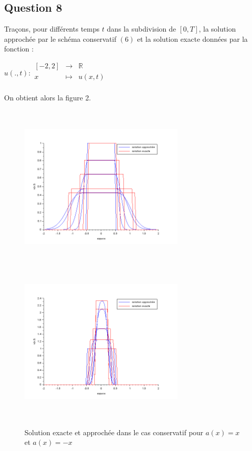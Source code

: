 \documentclass[a4paper,12pt]{article}
\begin{document}
\subsection{Question 8}

Tra\c{c}ons, pour diff\'erents temps $t$ dans la subdivision de $[0,T]$, la solution approch\'ee par le sch\'ema conservatif $(6)$ et la solution exacte donn\'ees par la fonction :
\begin{center}
  $u(.,t):\begin{array}{ccccc}
	[-2,2] & \to & \mathbb{R}\\
	x & \mapsto & u(x,t)\\
	\end{array}$
\end{center}
On obtient alors la figure 2.

\begin{figure}[h!]
\begin{center}
	\includegraphics[width=225pt,height=225pt]{image/figure_2}
	\includegraphics[width=225pt,height=225pt]{image/figure_3}
\end{center}
\caption{Solution exacte et approch\'ee dans le cas conservatif pour $a(x)=x$ et $a(x)=-x$}
\label{Solution exacte et approch\'ee dans le cas conservatif pour $a(x)=x$ et $a(x)=-x$}
\end{figure}
\end{document}
